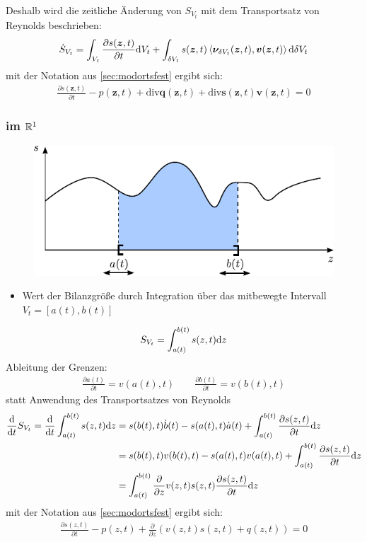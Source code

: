 Deshalb wird die zeitliche Änderung von $S_{V_t}$ mit dem Transportsatz von Reynolds beschrieben:
\begin{align*}
\dot{S}_{V_t} = \int_{V_t} \frac{\partial s(\bm{z},t)}{\partial t}\mathrm{d} V_t + \int_{\delta V_t}s(\bm{z},t) \left\langle \bm{\nu}_{\delta V_t}(\bm{z},t),\bm{v}(\bm{z},t) \right\rangle \mathrm{d} \delta V_t
\end{align*}
mit der Notation aus \ref{sec:modortsfest} ergibt sich:
\begin{align}
\frac{\partial s(\bm{z},t)}{\partial t}-p(\bm{z},t)+\mathrm{div}\bm{q}(\bm{z},t)+\mathrm{div}\bm{s}(\bm{z},t)\bm{v}(\bm{z},t) = 0
\end{align}
\subsubsection{im $\mathbb{R}^1$}
\begin{figure}[ht]
	\centering
	\includegraphics{img/bilanz1d}
	\label{fig:bilanz1d}
\end{figure}
\begin{itemize}
\item Wert der Bilanzgröße durch Integration über das mitbewegte Intervall $V_t=[a(t),b(t)]$
\end{itemize}
\begin{align*}
S_{V_t}=\int_{a(t)}^{b(t)}s(z,t)\mathrm{d} z
\end{align*}
Ableitung der Grenzen:
\begin{align*}
\frac{\partial a(t)}{\partial t} = v(a(t),t) \qquad \frac{\partial b(t)}{\partial t} = v(b(t),t)
\end{align*}
statt Anwendung des Transportsatzes von Reynolds
\begin{align*}
\frac{\mathrm{d}}{\mathrm{d} t}S_{V_t} = \frac{\mathrm{d}}{\mathrm{d} t}\int_{a(t)}^{b(t)}s(z,t)\mathrm{d} z &= s(b(t),t)\dot{b}(t)-s(a(t),t)\dot{a}(t)+\int_{a(t)}^{b(t)}\frac{\partial s(z,t)}{\partial t}\mathrm{d} z \\
&= s(b(t),t)v(b(t),t)-s(a(t),t)v(a(t),t)+\int_{a(t)}^{b(t)}\frac{\partial s(z,t)}{\partial t}\mathrm{d} z \\
&=\int_{a(t)}^{b(t)}\frac{\partial}{\partial z}v(z,t)s(z,t)\frac{\partial s(z,t)}{\partial t}\mathrm{d} z 
\end{align*}
mit der Notation aus \ref{sec:modortsfest} ergibt sich:
\begin{align}
\frac{\partial s(z,t)}{\partial t}-p(z,t)+\frac{\partial}{\partial z}(v(z,t)s(z,t)+q(z,t))= 0
\end{align}